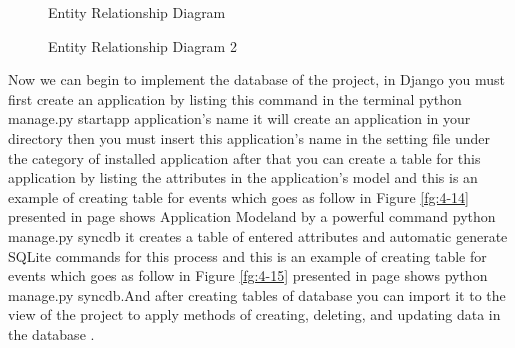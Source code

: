 \documentclass[12pt,a4paper,class,twoside,openany]{report}
\begin{document}
{\begin{figure}
\begin{center}
\caption{Entity Relationship Diagram}
\label{fg:4-12}
\end{center}
\end{figure}
\begin{figure}
\begin{center}
\caption{Entity Relationship Diagram 2}
\label{fg:4-13}
\end{center}
\end{figure}
Now we can begin to implement the database of the project, in Django you must first create an application by listing this command in the terminal python manage.py startapp application's name it will create an application in your directory then you must insert this application's name in the setting file under the category of installed application after that you can create a table for this application by listing the attributes in the application's model and this is an example of creating table for events which goes as follow in Figure \ref{fg:4-14}  presented in page \pageref{fg:4-14}  shows Application Modeland by a powerful command  python manage.py syncdb it creates a table of entered attributes and automatic generate SQLite commands for this process and this is an example of creating table for events which goes as follow  in Figure \ref{fg:4-15}  presented in page \pageref{fg:4-15}  shows python manage.py syncdb.And after creating tables of database you can import it to the view of the project to apply methods of creating, deleting, and updating data in the database .
}
\end{document}
